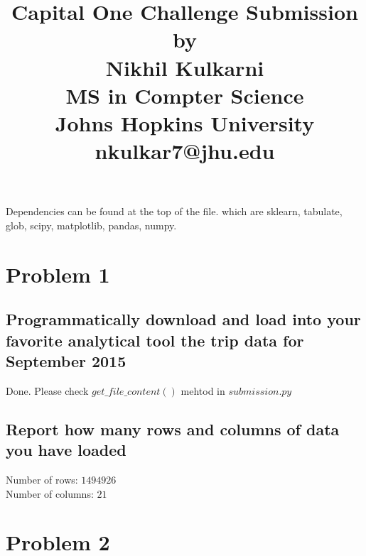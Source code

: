 \documentclass[letterpaper, 11pt]{article}
\begin{document}
\title{ Capital One Challenge Submission\\by\\Nikhil Kulkarni\\MS in Compter Science\\Johns Hopkins University \\ nkulkar7@jhu.edu}

	
\maketitle
Dependencies can be found at the top of the file.
which are sklearn, tabulate, glob, scipy, matplotlib, pandas, numpy.	
\newpage
\section*{ Problem 1 }
\subsection*{Programmatically download and load into your favorite analytical tool the trip data for September 2015}
Done. Please check $get\_file\_content()$ mehtod in $submission.py$ 
\subsection*{Report how many rows and columns of data you have loaded}
Number of rows: $1494926$\\
Number of columns:  $21$

\newpage
\section*{ Problem 2 }
\end{document}
